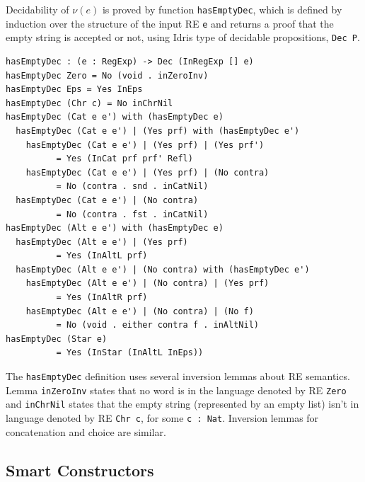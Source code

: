 \documentclass{llncs}
\newcommand{\idris}[1]{\texttt{#1}}%
\begin{document}
Decidability of $\nu(e)$ is proved by function \idris{hasEmptyDec},
which is defined by induction over the structure of the input RE
\idris{e} and returns a proof that the empty string is accepted or
not, using Idris type of decidable propositions, \idris{Dec P}.
\begin{verbatim}
hasEmptyDec : (e : RegExp) -> Dec (InRegExp [] e)
hasEmptyDec Zero = No (void . inZeroInv)
hasEmptyDec Eps = Yes InEps
hasEmptyDec (Chr c) = No inChrNil
hasEmptyDec (Cat e e') with (hasEmptyDec e)
  hasEmptyDec (Cat e e') | (Yes prf) with (hasEmptyDec e')
    hasEmptyDec (Cat e e') | (Yes prf) | (Yes prf')
          = Yes (InCat prf prf' Refl)
    hasEmptyDec (Cat e e') | (Yes prf) | (No contra)
          = No (contra . snd . inCatNil)
  hasEmptyDec (Cat e e') | (No contra)
          = No (contra . fst . inCatNil)
hasEmptyDec (Alt e e') with (hasEmptyDec e)
  hasEmptyDec (Alt e e') | (Yes prf)
          = Yes (InAltL prf)
  hasEmptyDec (Alt e e') | (No contra) with (hasEmptyDec e')
    hasEmptyDec (Alt e e') | (No contra) | (Yes prf)
          = Yes (InAltR prf)
    hasEmptyDec (Alt e e') | (No contra) | (No f)
          = No (void . either contra f . inAltNil)
hasEmptyDec (Star e)
          = Yes (InStar (InAltL InEps))
\end{verbatim}
The \idris{hasEmptyDec} definition uses several inversion lemmas about
RE semantics. Lemma \idris{inZeroInv} states that no
word is in the language denoted by RE \idris{Zero} and
\idris{inChrNil} states that the empty string (represented by an empty
list) isn't in language denoted by RE \idris{Chr c}, for some \idris{c
: Nat}. Inversion lemmas for concatenation and choice are similar.

\subsection{Smart Constructors}\label{sec:smart}
\end{document}

